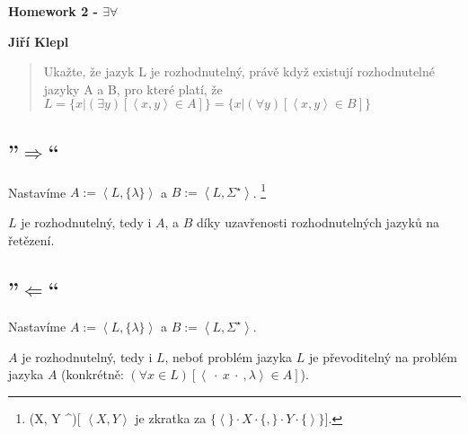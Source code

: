 \documentclass[a4paper,12pt]{article} %
\begin{document}
\thispagestyle{empty} %

\begin{center}
	{\Large \bf Homework 2 - $\exists\forall$}
	\vspace{2mm}
	
	{\bf Jiří Klepl}
		
\end{center}  

\vspace{0.4cm}


\begin{quote}
Ukažte, že jazyk L je rozhodnutelný, právě když existují rozhodnutelné jazyky A a B, pro které platí, že $L=\{x | (\exists y)[\left<x, y\right> \in A]\} = \{x | (\forall y)[\left<x,y\right> \in B]\}$
\end{quote}

\subsection*{''$\Rightarrow$``}

Nastavíme $A := \left<L, \{\lambda\}\right>$ a $B := \left<L,\Sigma^\star\right>$.
\footnote{(\forall X, Y \subseteq \Sigma^\star)[\label{foot} $\left< X, Y\right>$ je zkratka za $\{\left<\right.\} \cdot X \cdot \{,\} \cdot Y \cdot \{\left.\right>\}]$.}

$L$ je rozhodnutelný, tedy i $A$, a $B$ díky uzavřenosti rozhodnutelných jazyků na řetězení.

\subsection*{''$\Leftarrow$``}

Nastavíme $A := \left<L, \{\lambda\}\right>$ a $B := \left<L,\Sigma^\star\right>$. \footnotemark[\ref{foot}]

$A$ je rozhodnutelný, tedy i $L$, neboť problém jazyka $L$ je převoditelný na problém jazyka $A$ (konkrétně: $(\forall x \in L)[\left<\ \cdot\  x\ \cdot\ ,\lambda\right> \in A]$).
\end{document}
